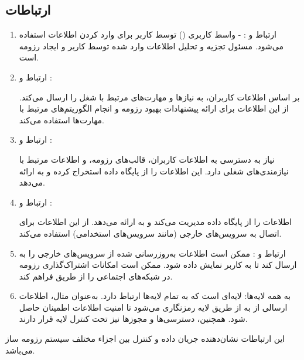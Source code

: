 \documentclass[]{article}
\begin{document}
	\subsection{\LARGE{ارتباطات}}
	\begin{enumerate}
	\item 
	 ارتباط
	   و
	   :
	\subitem
	   - واسط کاربری
	    () 
	    توسط کاربر برای وارد کردن اطلاعات استفاده می‌شود.
	\subitem
	    مسئول تجزیه و تحلیل اطلاعات وارد شده توسط کاربر و ایجاد رزومه است.
	
	\item 
	 ارتباط
	   و 
	  :
	
	\subitem
	   بر اساس اطلاعات کاربران، به
	    نیازها و مهارت‌های مرتبط با شغل را ارسال می‌کند.
	\subitem
	     از این اطلاعات برای ارائه پیشنهادات بهبود رزومه و انجام الگوریتم‌های مرتبط با مهارت‌ها استفاده می‌کند.
	
	\item 
	ارتباط
	 و
	 :
	
	\subitem
	  نیاز به دسترسی به اطلاعات کاربران، قالب‌های رزومه، و اطلاعات مرتبط با نیازمندی‌های شغلی دارد.
	\subitem
	  این اطلاعات را از پایگاه داده استخراج کرده و به 
	  ارائه می‌دهد.
	\item 
	ارتباط 
	 و :
	
	\subitem
	    اطلاعات را از پایگاه داده مدیریت می‌کند و به
	      ارائه می‌دهد.
	\subitem
	    از این اطلاعات برای اتصال به سرویس‌های خارجی (مانند سرویس‌های استخدامی) استفاده می‌کند.
	
	\item 
	ارتباط 
	 و :
	\subitem
	    ممکن است اطلاعات به‌روزرسانی شده از سرویس‌های خارجی را به 
	    ارسال کند تا به کاربر نمایش داده شود.
	\subitem
	    ممکن است امکانات اشتراک‌گذاری رزومه در شبکه‌های اجتماعی را از طریق  فراهم کند.
	
	\item 
	 به همه لایه‌ها:
	\subitem
	 لایه‌ای است که به تمام لایه‌ها ارتباط دارد. به‌عنوان مثال، اطلاعات ارسالی از  به  از طریق لایه  رمزنگاری می‌شود تا امنیت اطلاعات اطمینان حاصل شود. همچنین، دسترسی‌ها و مجوزها نیز تحت کنترل لایه  قرار دارند.
	
	\end{enumerate}
	
	این ارتباطات نشان‌دهنده جریان داده و کنترل بین اجزاء مختلف سیستم رزومه ساز می‌باشد.
	
	
	
	
	
	
	
	
	
	
	
	
	
	
	
\end{document}
